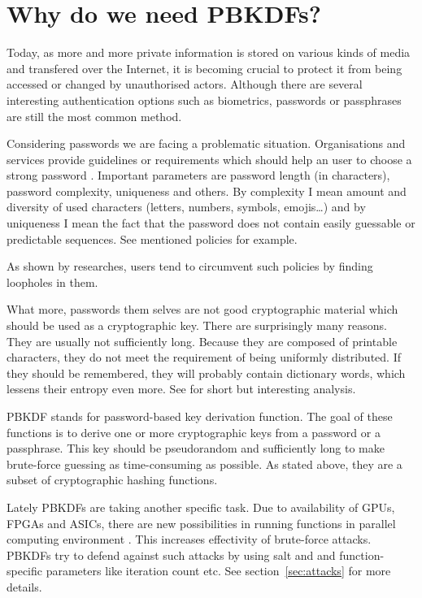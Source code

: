 \documentclass[nolof]{fithesis3}
\begin{document}
\section{Why do we need PBKDFs?}
Today, as more and more private information is stored on various kinds of media and transfered over the Internet, it is becoming crucial to protect it from being accessed or changed by unauthorised actors. Although there are several interesting authentication options such as biometrics, passwords or passphrases are still the most common method.

Considering passwords we are facing a problematic situation. Organisations and services provide guidelines or requirements which should help an user to choose a strong password \parencite{nistpasswords} \parencite{sanspasswordguidelines}. Important parameters are password length (in characters), password complexity, uniqueness and others. By complexity I mean amount and diversity of used characters (letters, numbers, symbols, emojis\dots) and by uniqueness I mean the fact that the password does not contain easily guessable or predictable sequences. See mentioned policies for example.

As shown by researches, users tend to circumvent such policies by finding loopholes in them. %

What more, passwords them selves are not good cryptographic material which should be used as a cryptographic key. There are surprisingly many reasons. They are usually not sufficiently long. Because they are composed of printable characters, they do not meet the requirement of being uniformly distributed. If they should be remembered, they will probably contain dictionary words, which lessens their entropy even more. See \parencite[section 5.6.4]{itmc14} for short but interesting analysis.

PBKDF stands for password-based key derivation function. The goal of these functions is to derive one or more cryptographic keys from a password or a passphrase. This key should be pseudorandom and sufficiently long to make brute-force guessing as time-consuming as possible. As stated above, they are a subset of cryptographic hashing functions.

Lately PBKDFs are taking another specific task. Due to availability of GPUs, FPGAs and ASICs, there are  new possibilities in running functions in parallel computing environment \parencite[see][chapter 4]{mosnacek}. This increases effectivity of brute-force attacks. PBKDFs try to defend against such attacks by using salt and and function-specific parameters like iteration count etc. See section~\ref{sec:attacks} for more details.
\end{document}
